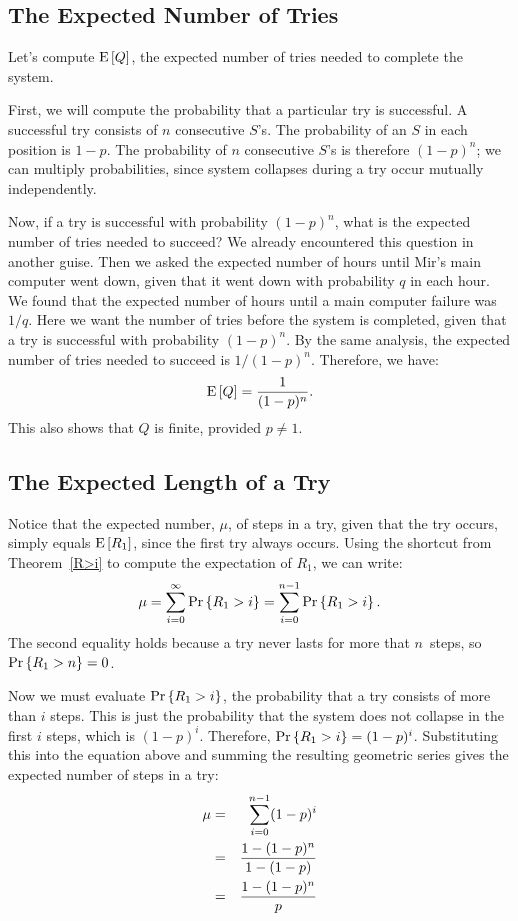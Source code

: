 \documentclass[11pt,twoside]{article}
\begin{document}
\subsection{The Expected Number of Tries}

Let's compute $\mathop{\textup{E}}\nolimits\left[Q\right]$, the expected number of tries needed to
complete the system.

First, we will compute the probability that a particular try is
successful.  A successful try consists of $n$ consecutive $S$'s.  The
probability of an $S$ in each position is $1-p$.  The probability of $n$
consecutive $S$'s is therefore $(1-p)^n$; we can multiply probabilities,
since system collapses during a try occur mutually independently.

Now, if a try is successful with probability $(1-p)^n$, what is the
expected number of tries needed to succeed?  We already encountered this
question in another guise.  Then we asked the expected number of hours
until Mir's main computer went down, given that it went down with
probability $q$ in each hour.  We found that the expected number of hours
until a main computer failure was $1/q$.  Here we want the number
of tries before the system is completed, given that a try is successful
with probability $(1-p)^n$.  By the same analysis, the expected number of
tries needed to succeed is $1/(1-p)^n$.  Therefore, we have:
\begin{equation}\label{eQ}
\mathop{\textup{E}}\nolimits\left[Q\right] = \frac{1}{(1-p)^n}.
\end{equation}
This also shows that $Q$ is finite, provided $p \neq 1$.

\subsection{The Expected Length of a Try}

Notice that the expected number, $\mu$, of steps in a try, given that the
try occurs, simply equals $\mathop{\textup{E}}\nolimits\left[R_1\right]$, since the first try always
occurs.  Using the shortcut from Theorem~\ref{R>i} to compute the
expectation of $R_1$, we can write:
\begin{displaymath}
  \mu = \sum_{i=0}^{\infty} \mathop{\textup{Pr}}\nolimits\left\{R_1 > i\right\} = \sum_{i=0}^{n-1} \mathop{\textup{Pr}}\nolimits\left\{R_1 > i\right\}.
\end{displaymath}
The second equality holds because a try never lasts for more that
$n$~steps, so $\mathop{\textup{Pr}}\nolimits\left\{R_1 > n\right\} = 0$.

Now we must evaluate $\mathop{\textup{Pr}}\nolimits\left\{R_1 > i\right\}$, the probability that a try
consists of more than $i$ steps.  This is just the probability that
the system does not collapse in the first $i$ steps, which is
$(1-p)^i$.  Therefore, $\mathop{\textup{Pr}}\nolimits\left\{R_1 > i\right\} = (1-p)^i$.  Substituting this
into the equation above and summing the resulting geometric series
gives the expected number of steps in a try:
\begin{eqnarray}
\mu     & = & \sum_{i=0}^{n-1} (1-p)^i \notag\\
           & = & \frac{1 - (1-p)^n}{1 - (1-p)} \notag\\
           & = & \frac{1 - (1-p)^n}{p} \label{mufrac}
\end{eqnarray}
\end{document}
